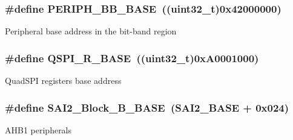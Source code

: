 \subsubsection[{\texorpdfstring{P\+E\+R\+I\+P\+H\+\_\+\+B\+B\+\_\+\+B\+A\+SE}{PERIPH_BB_BASE}}]{\setlength{\rightskip}{0pt plus 5cm}\#define P\+E\+R\+I\+P\+H\+\_\+\+B\+B\+\_\+\+B\+A\+SE~((uint32\+\_\+t)0x42000000)}\hypertarget{group___peripheral__memory__map_gaed7efc100877000845c236ccdc9e144a}{}\label{group___peripheral__memory__map_gaed7efc100877000845c236ccdc9e144a}
Peripheral base address in the bit-\/band region 
\subsubsection[{\texorpdfstring{Q\+S\+P\+I\+\_\+\+R\+\_\+\+B\+A\+SE}{QSPI_R_BASE}}]{\setlength{\rightskip}{0pt plus 5cm}\#define Q\+S\+P\+I\+\_\+\+R\+\_\+\+B\+A\+SE~((uint32\+\_\+t)0x\+A0001000)}\hypertarget{group___peripheral__memory__map_ga3b6b7d9c67dec50557fd634505198e9d}{}\label{group___peripheral__memory__map_ga3b6b7d9c67dec50557fd634505198e9d}
Quad\+S\+PI registers base address 
\subsubsection[{\texorpdfstring{S\+A\+I2\+\_\+\+Block\+\_\+\+B\+\_\+\+B\+A\+SE}{SAI2_Block_B_BASE}}]{\setlength{\rightskip}{0pt plus 5cm}\#define S\+A\+I2\+\_\+\+Block\+\_\+\+B\+\_\+\+B\+A\+SE~(S\+A\+I2\+\_\+\+B\+A\+SE + 0x024)}\hypertarget{group___peripheral__memory__map_ga034a6ac8f61e4d15cd9f2f7eca140569}{}\label{group___peripheral__memory__map_ga034a6ac8f61e4d15cd9f2f7eca140569}
A\+H\+B1 peripherals 

